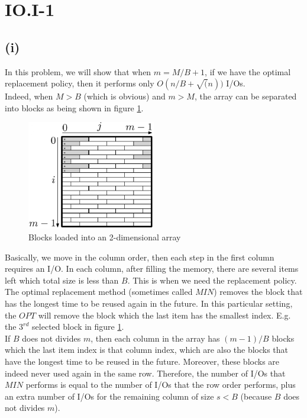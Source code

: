 \section*{IO.I-1}
\subsection*{(i)}
In this problem, we will show that when $m = M/B + 1$, if we have the optimal replacement policy, then it performs only $O(n/B + \sqrt(n))$ I/Os.\\

Indeed, when $M > B$ (which is obvious) and $m > M$, the array can be separated into blocks as being shown in figure \ref{fig:row-major}. \\

\begin{figure}
  \centering
  \includegraphics[width=0.5\textwidth]{row-major}
  \caption{Blocks loaded into an 2-dimensional array}
  \label{fig:row-major}
\end{figure}

Basically, we move in the column order, then each step in the first column requires an I/O. In each column, after filling the memory, there are several items left which total size is less than $B$. This is when we need the replacement policy. The optimal replacement method (sometimes called $MIN$) removes the block that has the longest time to be reused again in the future. In this particular setting, the $OPT$ will remove the block which the last item has the smallest index. E.g. the $3^{rd}$ selected block in figure \ref{fig:row-major}.\\

If $B$ does not divides $m$, then each column in the array has $(m - 1) / B$ blocks which the last item index is that column index, which are also the blocks that have the longest time to be reused in the future. Moreover, these blocks are indeed never used again in the same row. Therefore, the number of I/Os that $MIN$ performs is equal to the number of I/Os that the row order performs, plus an extra number of I/Os for the remaining column of size $s < B$ (because $B$ does not divides $m$).\\

